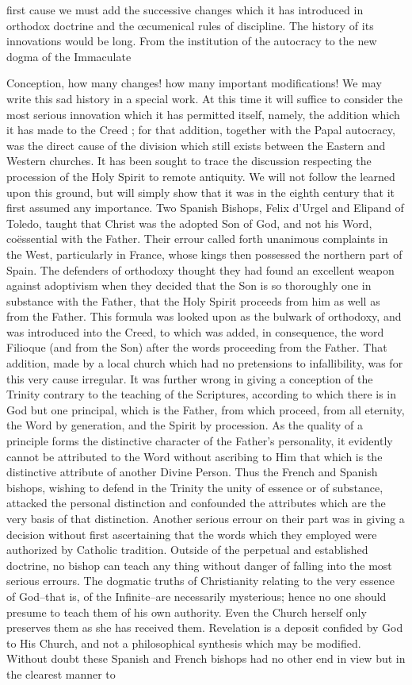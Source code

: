 first cause we must add the successive changes which it has introduced in orthodox doctrine and the œcumenical rules of discipline. The history of its innovations would be long. From the institution of the autocracy to the new dogma of the Immaculate

Conception, how many changes! how many important modifications! We may write this sad history in a special work. At this time it will suffice to consider the most serious innovation which it has permitted itself, namely, the addition which it has made to the Creed ; for that addition, together with the Papal autocracy, was the direct cause of the division which still exists between the Eastern and Western churches. It has been sought to trace the discussion respecting the procession of the Holy Spirit to remote antiquity. We will not follow the learned upon this ground, but will simply show that it was in the eighth century that it first assumed any importance. Two Spanish Bishops, Felix d’Urgel and Elipand of Toledo, taught that Christ was the adopted Son of God, and not his Word, coëssential with the Father. Their errour called forth unanimous complaints in the West, particularly in France, whose kings then possessed the northern part of Spain. The defenders of orthodoxy thought they had found an excellent weapon against adoptivism when they decided that the Son is so thoroughly one in substance with the Father, that the Holy Spirit proceeds from him as well as from the Father. This formula was looked upon as the bulwark of orthodoxy, and was introduced into the Creed, to which was added, in consequence, the word Filioque (and from the Son) after the words proceeding from the Father. That addition, made by a local church which had no pretensions to infallibility, was for this very cause irregular. It was further wrong in giving a conception of the Trinity contrary to the teaching of the Scriptures, according to which there is in God but one principal, which is the Father, from which proceed, from all eternity, the Word by generation, and the Spirit by procession. As the quality of a principle forms the distinctive character of the Father's personality, it evidently cannot be attributed to the Word without ascribing to Him that which is the distinctive attribute of another Divine Person. Thus the French and Spanish bishops, wishing to defend in the Trinity the unity of essence or of substance, attacked the personal distinction and confounded the attributes which are the very basis of that distinction. Another serious errour on their part was in giving a decision without first ascertaining that the words which they employed were authorized by Catholic tradition. Outside of the perpetual and established doctrine, no bishop can teach any thing without danger of falling into the most serious errours. The dogmatic truths of Christianity relating to the very essence of God--that is, of the Infinite--are necessarily mysterious; hence no one should presume to teach them of his own authority. Even the Church herself only preserves them as she has received them. Revelation is a deposit confided by God to His Church, and not a philosophical synthesis which may be modified. Without doubt these Spanish and French bishops had no other end in view but in the clearest manner to 